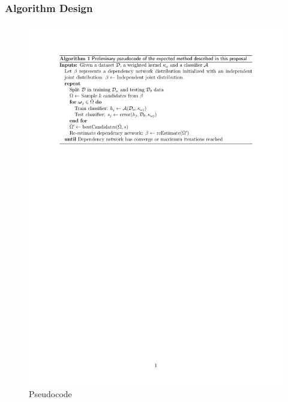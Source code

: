 \begin{frame}
\frametitle{Algorithm Design}
\begin{figure}
	\centering
		\includegraphics[width=1\textwidth]{AlgorithmDesign.pdf}
	\caption{Pseudocode}
	\label{fig:AlgorithmDesign}
\end{figure}

\end{frame}